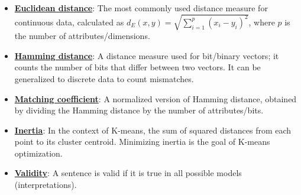 \documentclass{article}%
\begin{document}
\begin{itemize}[leftmargin=*]
\item \href{https://purdue.brightspace.com/d2l/common/assets/pdfjs-d2l-dist/1.0.14-legacy/web/viewer.html?file=\%2Fcontent\%2Fenforced\%2F1095467-wl.202510.CS.24300.001\%2F12L2-distance-clusters.pdf\%3Fou\%3D1095467\&lang=en-us\&container=d2l-fileviewer-rendered-pdf\&fullscreen=d2l-fileviewer-rendered-pdf-dialog\&height=667#page=17}{\textbf{Euclidean distance}}: The most commonly used distance measure for continuous data, calculated as $d_E(x, y) = \sqrt{\sum_{i=1}^p (x_i - y_i)^2}$, where $p$ is the number of attributes/dimensions.%
\item \href{https://purdue.brightspace.com/d2l/common/assets/pdfjs-d2l-dist/1.0.14-legacy/web/viewer.html?file=\%2Fcontent\%2Fenforced\%2F1095467-wl.202510.CS.24300.001\%2F12L2-distance-clusters.pdf\%3Fou\%3D1095467\&lang=en-us\&container=d2l-fileviewer-rendered-pdf\&fullscreen=d2l-fileviewer-rendered-pdf-dialog\&height=667#page=19}{\textbf{Hamming distance}}: A distance measure used for bit/binary vectors; it counts the number of bits that differ between two vectors. It can be generalized to discrete data to count mismatches.%
\item \href{https://purdue.brightspace.com/d2l/common/assets/pdfjs-d2l-dist/1.0.14-legacy/web/viewer.html?file=\%2Fcontent\%2Fenforced\%2F1095467-wl.202510.CS.24300.001\%2F12L2-distance-clusters.pdf\%3Fou\%3D1095467\&lang=en-us\&container=d2l-fileviewer-rendered-pdf\&fullscreen=d2l-fileviewer-rendered-pdf-dialog\&height=667#page=19}{\textbf{Matching coefficient}}: A normalized version of Hamming distance, obtained by dividing the Hamming distance by the number of attributes/bits.%
\item \href{https://purdue.brightspace.com/d2l/common/assets/pdfjs-d2l-dist/1.0.14-legacy/web/viewer.html?file=\%2Fcontent\%2Fenforced\%2F1095467-wl.202510.CS.24300.001\%2F12L2-distance-clusters.pdf\%3Fou\%3D1095467\&lang=en-us\&container=d2l-fileviewer-rendered-pdf\&fullscreen=d2l-fileviewer-rendered-pdf-dialog\&height=667#page=33}{\textbf{Inertia}}: In the context of K-means, the sum of squared distances from each point to its cluster centroid. Minimizing inertia is the goal of K-means optimization.%
\item \href{https://purdue.brightspace.com/d2l/common/assets/pdfjs-d2l-dist/1.0.14-legacy/web/viewer.html?file=\%2Fcontent\%2Fenforced\%2F1095467-wl.202510.CS.24300.001\%2F13L1-Logic.pdf\%3Fou\%3D1095467\&lang=en-us\&container=d2l-fileviewer-rendered-pdf\&fullscreen=d2l-fileviewer-rendered-pdf-dialog\&height=667#page=13}{\textbf{Validity}}: A sentence is valid if it is true in all possible models (interpretations).%
\end{itemize}
\end{document}
